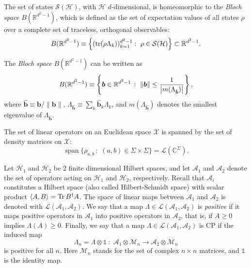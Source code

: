 \documentclass[12pt]{report}
\newcommand{\CC}{\mathbb{C}}
\newcommand{\RR}{\mathbb{R}}
\newcommand{\on}[1]{\operatorname{#1}}
\newcommand{\bs}[1]{\boldsymbol{#1}}
\newcommand{\calH}{{\mathcal{H}}}
\newcommand{\calL}{{\mathcal{L}}}
\newcommand{\calS}{{\mathcal{S}}}
\newcommand{\calX}{{\mathcal{X}}}
\begin{document}
\begin{prop}
	The set of states $\calS(\calH)$, with $\calH$ $d$-dimensional, is homeomorphic to the \emph{Bloch space} $B(\RR^{d^2-1})$, which is defined as the set of expectation values of all states $\rho$ over a complete set of traceless, orthogonal observables:
	\begin{equation}
		B(\RR^{d^2-1})\equiv\left\{
			(\tr(\rho\Lambda_k))_{k=1}^{d^2-1}:\,\,\rho\in\calS(\calH)
		\right\} \subset \RR^{d^2-1}.
	\end{equation}
\end{prop}

\begin{prop}
	The \emph{Bloch space} $B(\RR^{d^2-1})$ can be written as
	\begin{equation}
		B(\RR^{d^2-1}) \equiv \left\{
			\bs b\in\RR^{d^2-1}\,:\,\,\|\bs b\|\le\frac{1}{\abs{m(\Lambda_{\hat{\bs b}})}}
		\right\},
	\end{equation}
	where $\hat{\bs b}\equiv\bs b/\|\bs b\|$, $\Lambda_{\hat{\bs b}}\equiv\sum_k \hat{\bs b}_k \Lambda_k$, and $m(\Lambda_{\hat{\bs b}})$ denotes the smallest eigenvalue of $\Lambda_{\hat{\bs b}}$.
\end{prop}

\begin{prop}[a]
	The set of linear operators on an Euclidean space $\calX$ is spanned by the set of density matrices on $\calX$:
	\begin{equation}
		\on{span}\{\rho_{a,b}\,:\,\,(a,b)\in\Sigma\times\Sigma\}
		= \calL(\CC^\Sigma).
	\end{equation}
\end{prop}

\begin{defn}
	Let $\mathcal H_1$ and $\mathcal H_2$ be 2 finite dimensional Hilbert spaces,
	and let $\mathcal A_1$ and $\mathcal A_2$ denote the set of operators acting on $\mathcal H_1$ and $\mathcal H_2$, respectively.
	Recall that $\mathcal A_i$ constitutes a Hilbert space (also called Hilbert-Schmidt space) with scalar product $\langle A, B\rangle = \Tr B^\dagger A$.
	The space of linear maps between $\mathcal A_1$ and $\mathcal A_2$ is denoted with
	$\mathcal L(\mathcal A_1, \mathcal A_2)$.
	We say that a map $\Lambda \in \mathcal L(\mathcal A_1, \mathcal A_2)$ is \emph{positive}
	if it maps positive operators in $\mathcal A_1$ into positive operators in $\mathcal A_2$,
	that is,
	if $A \ge 0$ implies $\Lambda(A) \ge 0$.
	Finally, we say that a map $\Lambda \in \mathcal L(\mathcal A_1, \mathcal A_2)$ is \ac{CP} if the induced map
	\begin{equation}
		\Lambda_n = \Lambda \otimes \mathds1 \, : \,\,
		\mathcal A_1 \otimes \mathcal M_n \to \mathcal A_2 \otimes \mathcal M_n
	\end{equation}
	is positive for all $n$.
	Here $\mathcal M_n$ stands for the set of complex $n\times n$ matrices,
	and $\mathds 1$ is the identity map.
	\label{def:positive_maps}
\end{defn}
\end{document}
